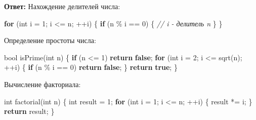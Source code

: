 \documentclass[
]{article}
\newenvironment{Shaded}{}{}
\newcommand{\CommentTok}[1]{\textcolor[rgb]{0.38,0.63,0.69}{\textit{#1}}}
\newcommand{\ControlFlowTok}[1]{\textcolor[rgb]{0.00,0.44,0.13}{\textbf{#1}}}
\newcommand{\DataTypeTok}[1]{\textcolor[rgb]{0.56,0.13,0.00}{#1}}
\newcommand{\DecValTok}[1]{\textcolor[rgb]{0.25,0.63,0.44}{#1}}
\newcommand{\KeywordTok}[1]{\textcolor[rgb]{0.00,0.44,0.13}{\textbf{#1}}}
\newcommand{\NormalTok}[1]{#1}
\newcommand{\OperatorTok}[1]{\textcolor[rgb]{0.40,0.40,0.40}{#1}}
\begin{document}
\begin{enumerate}
  \textbf{Ответ:} Нахождение делителей числа:

\begin{Shaded}
\begin{Highlighting}[]
\ControlFlowTok{for} \OperatorTok{(}\DataTypeTok{int}\NormalTok{ i }\OperatorTok{=} \DecValTok{1}\OperatorTok{;}\NormalTok{ i }\OperatorTok{\textless{}=}\NormalTok{ n}\OperatorTok{;} \OperatorTok{++}\NormalTok{i}\OperatorTok{)} \OperatorTok{\{}
    \ControlFlowTok{if} \OperatorTok{(}\NormalTok{n }\OperatorTok{\%}\NormalTok{ i }\OperatorTok{==} \DecValTok{0}\OperatorTok{)} \OperatorTok{\{}
        \CommentTok{// i {-} делитель n}
    \OperatorTok{\}}
\OperatorTok{\}}
\end{Highlighting}
\end{Shaded}

  Определение простоты числа:

\begin{Shaded}
\begin{Highlighting}[]
\DataTypeTok{bool}\NormalTok{ isPrime}\OperatorTok{(}\DataTypeTok{int}\NormalTok{ n}\OperatorTok{)} \OperatorTok{\{}
    \ControlFlowTok{if} \OperatorTok{(}\NormalTok{n }\OperatorTok{\textless{}=} \DecValTok{1}\OperatorTok{)} \ControlFlowTok{return} \KeywordTok{false}\OperatorTok{;}
    \ControlFlowTok{for} \OperatorTok{(}\DataTypeTok{int}\NormalTok{ i }\OperatorTok{=} \DecValTok{2}\OperatorTok{;}\NormalTok{ i }\OperatorTok{\textless{}=}\NormalTok{ sqrt}\OperatorTok{(}\NormalTok{n}\OperatorTok{);} \OperatorTok{++}\NormalTok{i}\OperatorTok{)} \OperatorTok{\{}
        \ControlFlowTok{if} \OperatorTok{(}\NormalTok{n }\OperatorTok{\%}\NormalTok{ i }\OperatorTok{==} \DecValTok{0}\OperatorTok{)} \ControlFlowTok{return} \KeywordTok{false}\OperatorTok{;}
    \OperatorTok{\}}
    \ControlFlowTok{return} \KeywordTok{true}\OperatorTok{;}
\OperatorTok{\}}
\end{Highlighting}
\end{Shaded}

  Вычисление факториала:

\begin{Shaded}
\begin{Highlighting}[]
\DataTypeTok{int}\NormalTok{ factorial}\OperatorTok{(}\DataTypeTok{int}\NormalTok{ n}\OperatorTok{)} \OperatorTok{\{}
    \DataTypeTok{int}\NormalTok{ result }\OperatorTok{=} \DecValTok{1}\OperatorTok{;}
    \ControlFlowTok{for} \OperatorTok{(}\DataTypeTok{int}\NormalTok{ i }\OperatorTok{=} \DecValTok{1}\OperatorTok{;}\NormalTok{ i }\OperatorTok{\textless{}=}\NormalTok{ n}\OperatorTok{;} \OperatorTok{++}\NormalTok{i}\OperatorTok{)} \OperatorTok{\{}
\NormalTok{        result }\OperatorTok{*=}\NormalTok{ i}\OperatorTok{;}
    \OperatorTok{\}}
    \ControlFlowTok{return}\NormalTok{ result}\OperatorTok{;}
\OperatorTok{\}}
\end{Highlighting}
\end{Shaded}


\end{enumerate}
\end{document}
